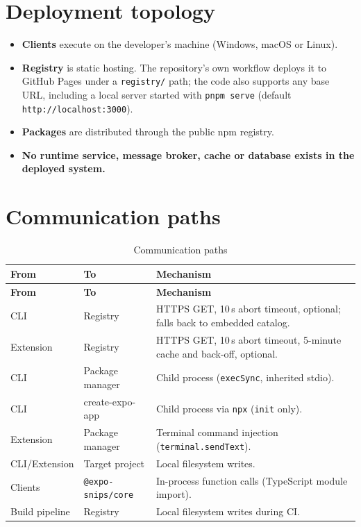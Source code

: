 \section{Deployment topology}

\begin{itemize}
  \item \textbf{Clients} execute on the developer's machine
        (Windows, macOS or Linux).
  \item \textbf{Registry} is static hosting. The repository's own workflow deploys
        it to GitHub Pages under a \texttt{registry/} path; the code also supports
        any base URL, including a local server started with
        \texttt{pnpm serve} (default \texttt{http://localhost:3000}).
  \item \textbf{Packages} are distributed through the public npm registry.
  \item \textbf{No runtime service, message broker, cache or database exists in the
        deployed system.}
\end{itemize}

\section{Communication paths}

\begin{longtable}{@{}L{3.2cm}L{3.4cm}L{7.4cm}@{}}
\caption{Communication paths}\\
\toprule
\textbf{From} & \textbf{To} & \textbf{Mechanism} \\
\midrule
\endfirsthead
\toprule
\textbf{From} & \textbf{To} & \textbf{Mechanism} \\
\midrule
\endhead
CLI & Registry & HTTPS GET, 10\,s abort timeout, optional; falls back to embedded catalog. \\
Extension & Registry & HTTPS GET, 10\,s abort timeout, 5-minute cache and back-off, optional. \\
CLI & Package manager & Child process (\texttt{execSync}, inherited stdio). \\
CLI & create-expo-app & Child process via \texttt{npx} (\texttt{init} only). \\
Extension & Package manager & Terminal command injection (\texttt{terminal.sendText}). \\
CLI/Extension & Target project & Local filesystem writes. \\
Clients & \texttt{@expo-snips/core} & In-process function calls (TypeScript module import). \\
Build pipeline & Registry & Local filesystem writes during CI. \\
\bottomrule
\end{longtable}


